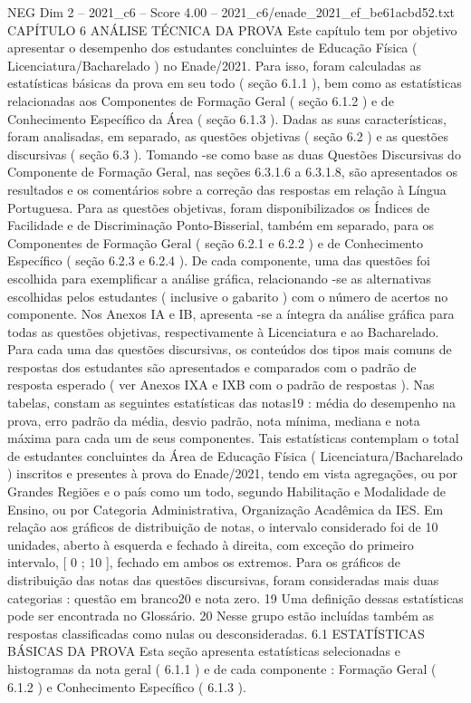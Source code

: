 \begin{textsample}{NEG Dim 2 – 2021\_c6 – Score 4.00 – 2021\_c6/enade\_2021\_ef\_be61acbd52.txt}  \label{ex:f2_neg_262}
CAPÍTULO 6 ANÁLISE TÉCNICA DA PROVA Este capítulo tem por objetivo apresentar o desempenho dos estudantes concluintes de Educação Física ( Licenciatura/Bacharelado ) no Enade/2021.
Para isso, foram calculadas as estatísticas básicas da prova em seu todo ( seção 6.1.1 ), bem como as estatísticas relacionadas aos Componentes de Formação Geral ( seção 6.1.2 ) e de Conhecimento Específico da Área ( seção 6.1.3 ).
Dadas as suas características, foram analisadas, em separado, as questões objetivas ( seção 6.2 ) e as questões discursivas ( seção 6.3 ).
Tomando -se como base as duas Questões Discursivas do Componente de Formação Geral, nas seções 6.3.1.6 a 6.3.1.8, são apresentados os resultados e os comentários sobre a correção das respostas em relação à Língua Portuguesa.
Para as questões objetivas, foram disponibilizados os Índices de Facilidade e de Discriminação Ponto-Bisserial, também em separado, para os Componentes de Formação Geral ( seção 6.2.1 e 6.2.2 ) e de Conhecimento Específico ( seção 6.2.3 e 6.2.4 ).
De cada componente, uma das questões foi escolhida para exemplificar a análise gráfica, relacionando -se as alternativas escolhidas pelos estudantes ( inclusive o gabarito ) com o número de acertos no componente.
Nos Anexos IA e IB, apresenta -se a íntegra da análise gráfica para todas as questões objetivas, respectivamente à Licenciatura e ao Bacharelado.
Para cada uma das questões discursivas, os conteúdos dos tipos mais comuns de respostas dos estudantes são apresentados e comparados com o padrão de resposta esperado ( ver Anexos IXA e IXB com o padrão de respostas ).
Nas tabelas, constam as seguintes estatísticas das notas19 : média do desempenho na prova, erro padrão da média, desvio padrão, nota mínima, mediana e nota máxima para cada um de seus componentes.
Tais estatísticas contemplam o total de estudantes concluintes da Área de Educação Física ( Licenciatura/Bacharelado ) inscritos e presentes à prova do Enade/2021, tendo em vista agregações, ou por Grandes Regiões e o país como um todo, segundo Habilitação e Modalidade de Ensino, ou por Categoria Administrativa, Organização Acadêmica da IES.
Em relação aos gráficos de distribuição de notas, o intervalo considerado foi de 10 unidades, aberto à esquerda e fechado à direita, com exceção do primeiro intervalo, [ 0 ; 10 ], fechado em ambos os extremos.
Para os gráficos de distribuição das notas das questões discursivas, foram consideradas mais duas categorias : questão em branco20 e nota zero. 19 Uma definição dessas estatísticas pode ser encontrada no Glossário. 20 Nesse grupo estão incluídas também as respostas classificadas como nulas ou desconsideradas. 6.1 ESTATÍSTICAS BÁSICAS DA PROVA Esta seção apresenta estatísticas selecionadas e histogramas da nota geral ( 6.1.1 ) e de cada componente : Formação Geral ( 6.1.2 ) e Conhecimento Específico ( 6.1.3 ).

\end{textsample}
